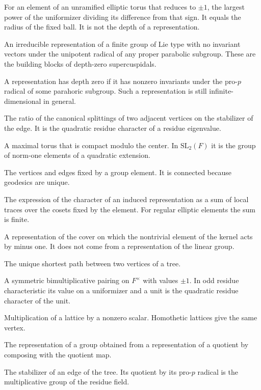 \documentclass[12pt,letterpaper]{article}
\numberwithin{equation}{section}
\theoremstyle{definition}
\theoremstyle{remark}
\begin{document}
\begin{description}[style=nextline,leftmargin=1.5em]
\item[Congruence depth] For an element of an unramified elliptic torus that reduces to $\pm1$, the largest power of the uniformizer dividing its difference from that sign. It equals the radius of the fixed ball. It is not the depth of a representation.
\item[Cuspidal finite representation] An irreducible representation of a finite group of Lie type with no invariant vectors under the unipotent radical of any proper parabolic subgroup. These are the building blocks of depth-zero supercuspidals.
\item[Depth zero] A representation has depth zero if it has nonzero invariants under the pro-$p$ radical of some parahoric subgroup. Such a representation is still infinite-dimensional in general.
\item[Edge discrepancy] The ratio of the canonical splittings of two adjacent vertices on the stabilizer of the edge. It is the quadratic residue character of a residue eigenvalue.
\item[Elliptic torus] A maximal torus that is compact modulo the center. In $\mathrm{SL}_2(F)$ it is the group of norm-one elements of a quadratic extension.
\item[Fixed subtree] The vertices and edges fixed by a group element. It is connected because geodesics are unique.
\item[Frobenius character formula] The expression of the character of an induced representation as a sum of local traces over the cosets fixed by the element. For regular elliptic elements the sum is finite.
\item[Genuine representation] A representation of the cover on which the nontrivial element of the kernel acts by minus one. It does not come from a representation of the linear group.
\item[Geodesic] The unique shortest path between two vertices of a tree.
\item[Hilbert symbol] A symmetric bimultiplicative pairing on $F^\times$ with values $\pm1$. In odd residue characteristic its value on a uniformizer and a unit is the quadratic residue character of the unit.
\item[Homothety] Multiplication of a lattice by a nonzero scalar. Homothetic lattices give the same vertex.
\item[Inflation] The representation of a group obtained from a representation of a quotient by composing with the quotient map.
\item[Iwahori subgroup] The stabilizer of an edge of the tree. Its quotient by its pro-$p$ radical is the multiplicative group of the residue field.

\end{description}
\end{document}
